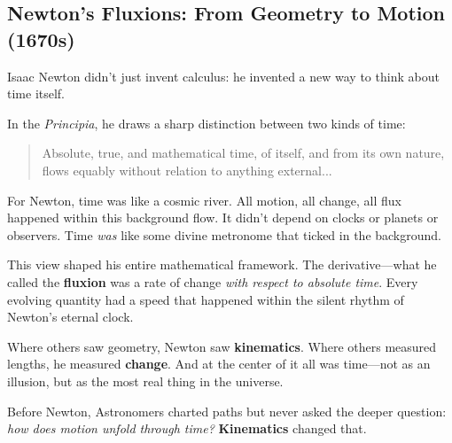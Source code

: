 \subsection{Newton’s Fluxions: From Geometry to Motion (1670s)}

  Isaac Newton didn’t just invent calculus: he invented a new way to think about time itself.
  
  In the \textit{Principia}, he draws a sharp distinction between two kinds of time:

  \begin{quote}
  Absolute, true, and mathematical time, of itself, and from its own nature, flows equably without relation to anything external...
  \end{quote}
  
  For Newton, time was like a cosmic river. All motion, all change, all flux happened within this background flow. It didn’t depend on clocks or planets or observers. Time \textit{was} like some divine metronome that ticked in the background.
  
  This view shaped his entire mathematical framework. The derivative—what he called the \textbf{fluxion} was a rate of change \textit{with respect to absolute time}. Every evolving quantity had a speed that happened within the silent rhythm of Newton’s eternal clock.

  Where others saw geometry, Newton saw \textbf{kinematics}. Where others measured lengths, he measured \textbf{change}. And at the center of it all was time—not as an illusion, but as the most real thing in the universe.

  Before Newton, Astronomers charted paths but never asked the deeper question: \textit{how does motion unfold through time?} \textbf{Kinematics} changed that.


